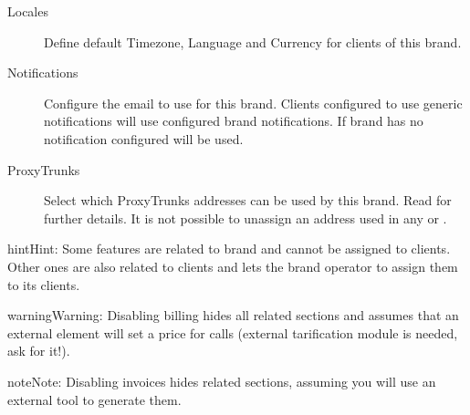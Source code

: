 \documentclass[letterpaper,10pt,english]{sphinxmanual}
\begin{document}
\begin{description}
\item[{Locales}] \leavevmode{}\label{administration_portal/platform/brands:term-locales}
Define default Timezone, Language and Currency for clients of this brand.

\item[{Notifications}] \leavevmode{}\label{administration_portal/platform/brands:term-notifications}
Configure the email {\hyperref[administration_portal/brand/settings/notification_templates:notification\string-templates]{}} to use for this brand.
Clients configured to use generic notifications will use configured
brand notifications. If brand has no notification configured
{\hyperref[administration_portal/platform/default_notification_templates:default\string-notification\string-templates]{}} will be used.

\item[{ProxyTrunks}] \leavevmode{}\label{administration_portal/platform/brands:term-proxytrunks}
Select which ProxyTrunks addresses can be used by this brand. Read {\hyperref[administration_portal/platform/infrastructure/proxy_trunks:proxy\string-trunks]{}}
for further details. It is not possible to unassign an address used in any {\hyperref[administration_portal/brand/providers/carriers:carriers]{}} or
{\hyperref[administration_portal/brand/providers/ddi_providers:ddi\string-providers]{}}.

\end{description}

\begin{notice}{hint}{Hint:}
Some features are related to brand and cannot be assigned to clients.
Other ones are also related to clients and lets the brand operator to
assign them to its clients.
\end{notice}

\begin{notice}{warning}{Warning:}
Disabling billing hides all related sections and assumes that an
external element will set a price for calls (external tarification
module is needed, ask for it!).
\end{notice}

\begin{notice}{note}{Note:}
Disabling invoices hides related sections, assuming you will use an
external tool to generate them.
\end{notice}
\end{document}
